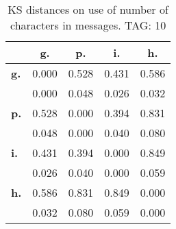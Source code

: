 \begin{table}[h!]
\begin{center}
\begin{tabular}{| l || c | c | c | c |}\hline
 & {\bf g.} & {\bf p.} & {\bf i.} & {\bf h.} \\\hline\hline
{\bf g.} & 0.000 & 0.528 & 0.431 & 0.586 \\
{\bf } & 0.000 & 0.048 & 0.026 & 0.032 \\\hline
{\bf p.} & 0.528 & 0.000 & 0.394 & 0.831 \\
{\bf } & 0.048 & 0.000 & 0.040 & 0.080 \\\hline
{\bf i.} & 0.431 & 0.394 & 0.000 & 0.849 \\
{\bf } & 0.026 & 0.040 & 0.000 & 0.059 \\\hline
{\bf h.} & 0.586 & 0.831 & 0.849 & 0.000 \\
{\bf } & 0.032 & 0.080 & 0.059 & 0.000 \\\hline
\end{tabular}
\caption{KS distances on use of number of characters in messages. TAG: 10}
\end{center}
\end{table}